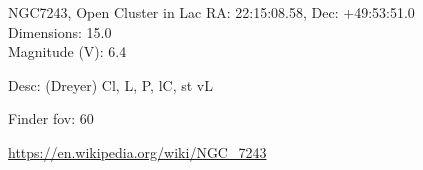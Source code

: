 \begin{block}{NGC7243, Open Cluster in Lac}
    RA: 22:15:08.58, Dec: +49:53:51.0 \\ 
    Dimensions: 15.0 \\ 
    Magnitude (V): 6.4


    Desc: (Dreyer) Cl, L, P, lC, st vL 

    Finder fov: 60 

    \url{https://en.wikipedia.org/wiki/NGC_7243} 
\end{block}